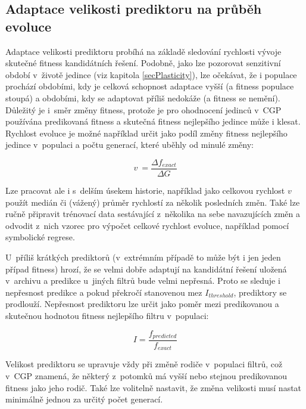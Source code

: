 \subsection{Adaptace velikosti prediktoru na průběh evoluce}
\label{secDesignAdaptation}

Adaptace velikosti prediktoru probíhá na základě sledování rychlosti vývoje skutečné fitness kan\-di\-dát\-ních ře\-šení. Podobně, jako lze pozorovat senzitivní období v~životě jedince (viz kapitola \ref{secPlasticity}), lze očekávat, že i populace prochází obdobími, kdy je celková schopnost adaptace vyšší (a fitness populace stoupá) a obdobími, kdy se adaptovat příliš nedokáže (a fitness se nemění). Důležitý je i~směr změny fitness, protože je pro ohodnocení je\-dinců v~CGP používána predikovaná fitness a skutečná fitness nejlepšího jedince může i klesat. Rychlost evoluce je možné například určit jako podíl změny fitness nej\-lep\-šího jedince v~populaci a počtu generací, které uběhly od minulé změny:

\begin{equation}
    \label{eqVelocity}
    v~= \frac{\Delta{}f_{\mathit{exact}}}{\Delta{}G}
\end{equation}

Lze pracovat ale i s~delším úsekem historie, například jako celkovou rychlost $v$ použít medián či (vážený) průměr rychlostí za několik posledních změn. Také lze ručně připravit trénovací data sestávající z~několika na sebe navazujících změn a odvodit z~nich vzorec pro výpočet celkové rychlost evoluce, například pomocí symbolické regrese.

U~příliš krátkých prediktorů (v~extrémním případě to může být i jen jeden případ fitness) hrozí, že se velmi dobře adaptují na kandidátní řešení uložená v~archivu a predikce u~jiných filtrů bude velmi nepřesná. Proto se sleduje i nepřesnost predikce a pokud překročí stanovenou mez $I_\mathit{threshold}$, prediktory se prodlouží. Nepřesnost prediktoru lze určit jako poměr mezi predikovanou a skutečnou hodnotou fitness nejlepšího filtru v~populaci:

\begin{equation}
    \label{eqInaccuracy}
    \mathit{I} = \frac{f_{\mathit{predicted}}}{f_{\mathit{exact}}}
\end{equation}

Velikost prediktoru se upravuje vždy při změně rodiče v~populaci filtrů, což v~CGP znamená, že některý z~potomků má vyšší nebo stejnou predikovanou fitness jako jeho rodič. Také lze volitelně nastavit, že změna velikosti musí nastat minimálně jednou za určitý počet generací.

